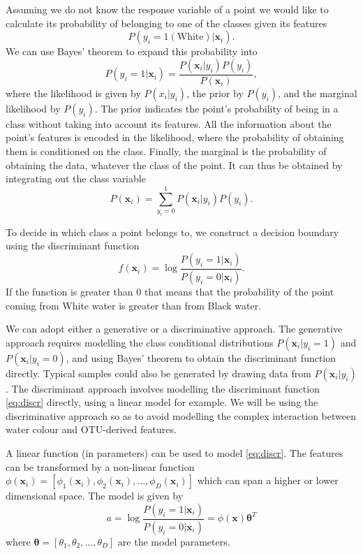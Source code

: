 Assuming we do not know the response variable of a point we would like to calculate its probability of belonging to one of the classes  given its features
\begin{equation}
	P(y_i = 1(\text{White})| \mathbf{x}_i).
\end{equation}  
We can use Bayes' theorem to expand this probability into
\begin{equation}
	P(y_i =1| \mathbf{x}_i) = \frac{P( \mathbf{x}_i|y_i)P(y_i)}{P( \mathbf{x}_i)},
\end{equation}
 where the likelihood is given by $P(x_i|y_i)$, the prior by $P(y_i)$, and the marginal likelihood by $P(y_i)$. The prior indicates the point's probability of being in a class without taking into account its features. All the information about the point's features is encoded in the likelihood, where the probability of obtaining them is conditioned on the class. Finally, the marginal is the probability of obtaining the data, whatever the class of the point. 
 It can thus  be obtained by integrating out the class variable
 \begin{equation}
 	P( \mathbf{x}_i) = \sum_{y_i =0}^{1} P( \mathbf{x}_i|y_i)P( y_i).
 \end{equation} 

To decide in which class a point belongs to, we construct a decision boundary using the discriminant function
\begin{equation}
f( \mathbf{x}_i)=\log \frac{P(y_i=1 |  \mathbf{x}_i)}{P(y_i = 0 |  \mathbf{x}_i)}.
\label{eq:discr}
\end{equation}
If the function is greater than $0$ that means that the probability of the point coming from White water is greater than from Black water. 


We can adopt either a generative or a discriminative approach. The generative approach requires modelling the class conditional distributions $P(\mathbf{x}_i|y_i = 1)$ and $P(\mathbf{x}_i|y_i = 0)$, and using Bayes' theorem to obtain the discriminant function directly. Typical samples could also be generated by drawing data from $P(\mathbf{x}_i|y_i)$. The discriminant approach involves modelling the discriminant function \eqref{eq:discr} directly, using a linear model for example. We will be using the discriminative approach so as to avoid modelling the complex interaction between water colour and OTU-derived features.


A linear function (in parameters) can be used to model \eqref{eq:discr}. The features can be transformed by a non-linear function $\phi( \mathbf{x}_i) = [\phi_1( \mathbf{x}_i),\phi_2( \mathbf{x}_i),...,\phi_D( \mathbf{x}_i)]$ which can span a higher or lower dimensional space. The model is given by
\begin{equation}
	a = \log \frac{P(y_i=1 |  \mathbf{x}_i)}{P(y_i = 0 |  \mathbf{x}_i)} = \phi( \mathbf{x}) \bm{\theta}^T
\end{equation}
  where $ \bm{\theta} = [\theta_1,\theta_2,...,\theta_D]$ are the model parameters.
  
